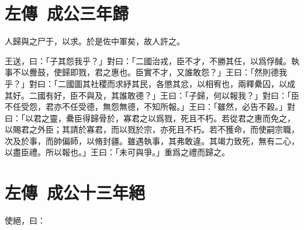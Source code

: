 \theendnotes 

\section[楚歸晉知罃\quad{\small 左傳 成公三年}]{{\normalsize 左傳\ 成公三年}\quad {}歸}
人歸與之尸于，以求。於是佐中軍矣，故人許之。

王送，曰：「子其怨我乎？」對曰：「二國治戎，臣不才，不勝其任，以爲俘馘。執事不以釁鼓，使歸即戮，君之惠也。臣實不才，又誰敢怨？」王曰：「然則德我乎？」對曰：「二國圖其社稷而求紓其民，各懲其忿，以相宥也，兩釋纍囚，以成其好。二國有好，臣不與及，其誰敢德？」王曰：「子歸，何以報我？」對曰：「臣不任受怨，君亦不任受德，無怨無德，不知所報。」王曰：「雖然，必告不穀。」對曰：「以君之靈，纍臣得歸骨於，寡君之以爲戮，死且不朽。若從君之惠而免之，以賜君之外臣；其請於寡君，而以戮於宗，亦死且不朽。若不獲命，而使嗣宗職，次及於事，而帥偏師，以脩封疆。雖遇執事，其弗敢違。其竭力致死，無有二心，以盡臣禮。所以報也。」王曰：「未可與爭。」重爲之禮而歸之。

\section[呂相絕秦\quad{\small 左傳 成公十三年}]{{\normalsize 左傳\ 成公十三年}\quad {}絕}
使絕，曰：

